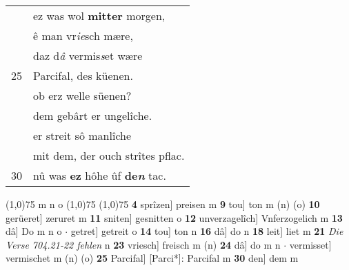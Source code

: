 \documentclass[8pt,a4paper,notitlepage]{article}
\begin{document}
\begin{table}[ht]
\begin{minipage}[t]{0.5\linewidth}
\begin{tabular}{rl}
 & ez was wol \textbf{mitter} morgen,\\ 
 & ê man vr\textit{ie}sch mære,\\ 
 & daz d\textit{â} vermis\textit{s}et wære\\ 
25 & Parcifal, des küenen.\\ 
 & ob erz welle süenen?\\ 
 & dem gebârt er ungelîche.\\ 
 & er streit sô manlîche\\ 
 & mit dem, der ouch strîtes pflac.\\ 
30 & nû was \textbf{ez} hôhe ûf \textbf{de\textit{n}} tac.\\ 
\end{tabular}
\scriptsize
\line(1,0){75} \newline
m n o \newline
\line(1,0){75} \newline
\newline
\line(1,0){75} \newline
\textbf{4} sprîzen] preisen m \textbf{9} tou] ton m (n) (o) \textbf{10} gerüeret] zeruret m \textbf{11} sniten] gesnitten o \textbf{12} unverzagelîch] Vnferzogelich m \textbf{13} dâ] Do m n o  $\cdot$ getret] getreit o \textbf{14} tou] ton n \textbf{16} dâ] do n \textbf{18} leit] liet m \textbf{21} \textit{Die Verse 704.21-22 fehlen} n  \textbf{23} vriesch] freisch m (n) \textbf{24} dâ] do m n  $\cdot$ vermisset] vermischet m (n) (o) \textbf{25} Parcifal] [Parci*]: Parcifal m \textbf{30} den] dem m \newline
\end{minipage}
\end{table}
\newpage
\end{document}
